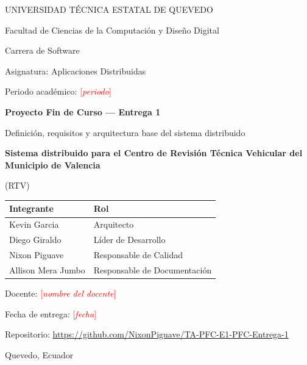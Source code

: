 \documentclass[11pt,a4paper]{article}
\newcommand{\pendiente}[1]{\textcolor{red}{[\textit{#1}]}}
\newcommand{\proyecto}{Sistema distribuido para el Centro de Revisión Técnica Vehicular del Municipio de Valencia}
\newcommand{\proyectocorto}{RTV}
\newcommand{\repourl}{https://github.com/NixonPiguave/TA-PFC-E1-PFC-Entrega-1}
\begin{document}
\begin{titlepage}
  \centering
  {\large UNIVERSIDAD TÉCNICA ESTATAL DE QUEVEDO\par}
  {\normalsize Facultad de Ciencias de la Computación y Diseño Digital\par}
  {\normalsize Carrera de Software\par}
  \vspace{1.5cm}
  {\normalsize Asignatura: Aplicaciones Distribuidas\par}
  {\normalsize Periodo académico: \pendiente{periodo}\par}
  \vspace{1.5cm}
  {\Large\bfseries Proyecto Fin de Curso — Entrega 1\par}
  \vspace{0.3cm}
  {\large Definición, requisitos y arquitectura base del sistema distribuido\par}
  \vspace{1cm}
  {\LARGE\bfseries \proyecto\par}
  \vspace{0.3cm}
  {\large (\proyectocorto)\par}
  \vspace{1.5cm}

  \begin{tabular}{ll}
    \toprule
    \textbf{Integrante} & \textbf{Rol} \\
    \midrule
    Kevin Garcia            & Arquitecto \\
    Diego Giraldo           & Líder de Desarrollo \\
    Nixon Piguave           & Responsable de Calidad \\
    Allison Mera Jumbo      & Responsable de Documentación \\
    \bottomrule
  \end{tabular}

  \vfill
  {\normalsize Docente: \pendiente{nombre del docente}\par}
  {\normalsize Fecha de entrega: \pendiente{fecha}\par}
  {\normalsize Repositorio: \url{\repourl}\par}
  \vspace{0.5cm}
  {\normalsize Quevedo, Ecuador\par}
\end{titlepage}
\end{document}
